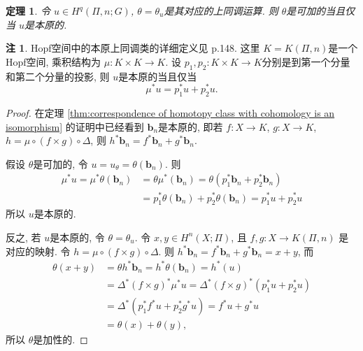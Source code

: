 \documentclass{ctexart}
\theoremstyle{plain}
\newtheorem{theorem}{定理}[section]
\theoremstyle{definition}
\newtheorem*{remark}{注}
\begin{document}
        \begin{theorem}
            令 $u\in H^{q}(\Pi,n;G)$, $\theta=\theta_{u}$是其对应的上同调运算. 则 $\theta$是可加的当且仅当 $u$是本原的.
        \end{theorem}

        \begin{remark}
            Hopf空间中的本原上同调类的详细定义见 \cite{Whitehead1978} p.148. 这里 $K=K(\Pi,n)$是一个Hopf空间, 乘积结构为 $\mu:K\times K\to K$. 设 $p_1,p_2:K\times K\to K$分别是到第一个分量和第二个分量的投影, 则 $u$是本原的当且仅当 
            \begin{equation*}
              \mu^{*}u=p_1^{*}u+p_2^{*}u.
            \end{equation*}
        \end{remark}

        \begin{proof}
            在定理 \ref{thm:correspondence of homotopy class with cohomology is an isomorphism} 的证明中已经看到 $\mathbf{b}_{n}$是本原的, 即若 $f:X\to K$, $g:X\to K$, $h=\mu \circ (f\times g)\circ \Delta$, 则 $h^{*}\mathbf{b}_{n}=f^{*}\mathbf{b}_{n}+g^{*}\mathbf{b}_{n}$.

            假设 $\theta$是可加的, 令 $u=u_{\theta}=\theta(\mathbf{b}_{n})$. 则 
            \begin{equation*}
                \begin{aligned}
                    \mu^* u=\mu^* \theta\left(\mathbf{b}_n\right) & =\theta \mu^*\left(\mathbf{b}_n\right)=\theta\left(p_1^* \mathbf{b}_n+p_2^* \mathbf{b}_n\right) \\
                    & =p_1^* \theta\left(\mathbf{b}_n\right)+p_2^* \theta\left(\mathbf{b}_n\right)=p_1^* u+p_2^* u
                \end{aligned}
            \end{equation*}
            所以 $u$是本原的.

            反之, 若 $u$是本原的, 令 $\theta=\theta_{u}$. 令 $x,y \in H^{n}(X;\Pi)$, 且 $f,g :X\to K(\Pi,n)$ 是对应的映射. 令 $h=\mu\circ(f\times g)\circ \Delta$. 则 $h^{*}\mathbf{b}_{n}=f^{*}\mathbf{b}_{n}+g^{*}\mathbf{b}_{n}=x+y$, 而 
            \begin{equation*}
                \begin{aligned}
                    \theta(x+y) & =\theta h^* \mathbf{b}_n=h^* \theta\left(\mathbf{b}_n\right)=h^*(u) \\
                    & =\Delta^*(f \times g)^* \mu^* u=\Delta^*(f \times g)^*\left(p_1^* u+p_2^* u\right) \\
                    & =\Delta^*\left(p_1^* f^{*} u+p_2^* g^* u\right)=f^* u+g^* u \\
                    & =\theta(x)+\theta(y),
                \end{aligned}
            \end{equation*}
            所以 $\theta$是加性的.
        \end{proof}
\end{document}
